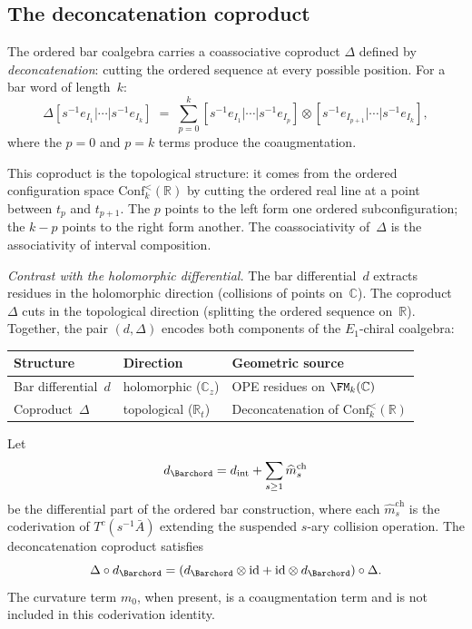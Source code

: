 \subsection{The deconcatenation coproduct}
\label{subsec:deconcatenation}

\begin{construction}
\label{constr:deconcatenation}
The ordered bar coalgebra carries a coassociative coproduct
$\Delta$ defined by \emph{deconcatenation}: cutting the
ordered sequence at every possible position. For a bar word
of length~$k$:
\[
\Delta[s^{-1}e_{I_1}|\cdots|s^{-1}e_{I_k}]
\;=\;
\sum_{p=0}^{k}
[s^{-1}e_{I_1}|\cdots|s^{-1}e_{I_p}]
\otimes
[s^{-1}e_{I_{p+1}}|\cdots|s^{-1}e_{I_k}],
\]
where the $p=0$ and $p=k$ terms produce the coaugmentation.

This coproduct is the topological structure: it comes from
the ordered configuration space
$\mathrm{Conf}_k^{<}(\mathbb R)$ by cutting the
ordered real line at a point between $t_p$ and $t_{p+1}$.
The $p$ points to the left form one ordered subconfiguration;
the $k{-}p$ points to the right form another. The coassociativity
of~$\Delta$ is the associativity of interval composition.

\emph{Contrast with the holomorphic differential.}
The bar differential~$d$ extracts residues in the holomorphic
direction (collisions of points on~$\mathbb C$). The coproduct
$\Delta$ cuts in the topological direction (splitting the
ordered sequence on~$\mathbb R$). Together, the pair
$(d,\Delta)$ encodes both components of the $E_1$-chiral
coalgebra:
\begin{center}
\begin{tabular}{lll}
\textbf{Structure} & \textbf{Direction} &
 \textbf{Geometric source} \\
\hline
Bar differential~$d$ & holomorphic ($\mathbb C_z$) &
 OPE residues on $\FM_k(\mathbb C)$ \\
Coproduct~$\Delta$ & topological ($\mathbb R_t$) &
 Deconcatenation of $\mathrm{Conf}_k^{<}(\mathbb R)$
\end{tabular}
\end{center}
\end{construction}

\begin{lemma}
\ClaimStatusProvedHere
\label{lem:deconcatenation-coderivation}
Let
\[
d_{\Barchord}
=d_{\mathrm{int}}+\sum_{s\ge 1}\widehat m_s^{\mathrm{ch}}
\]
be the differential part of the ordered bar construction, where
each $\widehat m_s^{\mathrm{ch}}$ is the coderivation of
$T^c(s^{-1}\bar A)$ extending the suspended $s$-ary collision
operation. The deconcatenation coproduct satisfies
\[
\Delta\circ d_{\Barchord}
=
(d_{\Barchord}\otimes\id+\id\otimes d_{\Barchord})\circ\Delta .
\]
The curvature term $m_0$, when present, is a coaugmentation term and
is not included in this coderivation identity.
\end{lemma}

